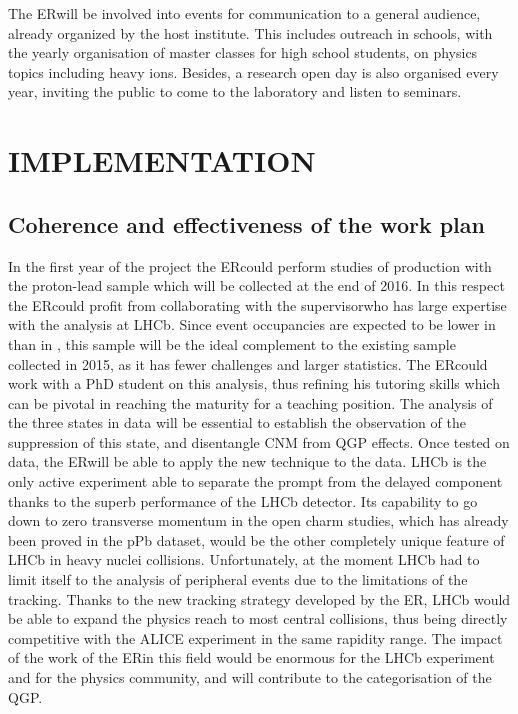 \documentclass[a4paper,11pt]{article}
\newcommand{\ER}{ER}
\newcommand{\supervisor}{the supervisor}
\begin{document}
The \ER will be involved into events for communication to a general audience, already organized by the host institute. This includes outreach in schools, with the yearly organisation of master classes for high school students, on physics topics including heavy ions. Besides, a research open day is also organised every year, inviting the public to come to the laboratory and listen to seminars.

%        

\section{IMPLEMENTATION}
\label{sec:implementation}

%            
           
\subsection{Coherence and effectiveness of the work plan}

In the first year of the project the \ER could perform studies of \PgU production with the proton-lead sample which will be collected at the end of 2016. In this respect the \ER could profit from collaborating with \supervisor who has large expertise with the \PgU analysis at LHCb. Since event occupancies are expected to be lower in \pPb than in \PbPb, this sample will be the ideal complement to the existing \PbPb sample collected in 2015, as it has fewer challenges and larger statistics. The \ER could work with a PhD student on this analysis, thus refining his tutoring skills which can be pivotal in reaching the maturity for a teaching position.
The analysis of the three \PgUn
states in \pPb data will 
be essential to establish the observation of 
the suppression of this state, and disentangle CNM from QGP effects.
Once tested on \pPb data, the \ER will be able to 
apply the new technique to the \PbPb data.
LHCb is the 
only active experiment able to separate 
the prompt from the delayed component thanks 
to the superb performance of the LHCb
detector. Its capability to go 
down to zero transverse momentum in the 
open charm studies, which has already been 
proved in the pPb dataset, would be the other 
completely unique feature of LHCb in
heavy nuclei collisions. Unfortunately, at the 
moment LHCb had to limit itself to the 
analysis of peripheral events due to the 
limitations of the tracking. Thanks to the new 
tracking strategy developed by the \ER, 
LHCb would be able to 
expand the physics reach to most central 
collisions, thus being directly competitive 
with the ALICE experiment in the same 
rapidity range. The impact of the work of
the \ER in this field would be enormous
for the LHCb experiment and for the  
physics community, and will contribute to 
the categorisation of the QGP.
\end{document}
